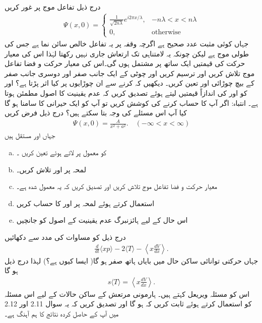 درج ذیل تفاعل موج پر غور کریں
\begin{align*}
\Psi(x,0) = \left\{ \begin{array}{lc}
\frac{1}{\sqrt{2n\lambda}}e^{i2\pi x/\lambda}, & -n\lambda < x < n \lambda \\ 0, & \text{otherwise}
\end{array} \right.
\end{align*}
جہاں  کوئی مثبت عدد صحیح ہے
اگرچہ وقفہ  پر یہ تفاعل خالص سائن نما ہے جس کی طولی موج  ہے لیکن چونکہ یہ لامتناہی تک ارتعاش جاری نہیں رکھتا لہٰذا اس کی معیار حرکت کی قیمتیں ایک ساتھ پر مشتمل ہوں گی۔اس کی معیار حرکت و فضا تفاعل موج  تلاش کریں  اور  ترسیم کریں اور چوٹی کے ایک جانب صفر اور دوسری جانب صفر کے بیچ چوڑائی اور  تعین کریں۔ دیکھیں کہ  کرنے سے ان چوڑایوں پر کیا اثر پڑتا ہے؟
  اور  کو اور  کی اندازاً قیمتیں لیتے ہوئے تصدیق کریں کہ عدم یقینیت کا اصول مطمئن ہوتا ہے۔ انتباہ: اگر آپ  کا حساب کرنے کی کوشش کریں تو آپ کو ایک حیرانی کا سامنا ہو گا کیا آپ اس مسئلے کی وجہ بتا سکتے ہیں؟ 
درج ذیل فرض کریں
\begin{align*}
\Psi(x,0) = \frac{A}{x^{2}+a^{2}}. \quad (-\infty < x < \infty)
\end{align*}
جہاں  اور  مستقل ہیں
\begin{enumerate}[a.]
\item {}کو معمول پر لاتے ہوئے  تعین کریں ۔
\item لمحہ  پر  اور  تلاش کریں۔
\item معیار حرکت و فضا تفاعل موج  تلاش کریں اور تصدیق کریں کہ یہ معمول شدہ ہے۔
\item {}استعمال کرتے ہوئے لمحہ  پر  اور  کا حساب کریں 
\item  اس حال کے لیے ہائزنبرگ عدم یقینیت کے اصول کو جانچیں 
\end{enumerate}
 درج ذیل کو مساوات  کی مدد سے دکھائیں 
\begin{align}
\frac{d}{dt} \langle xp \rangle -2\langle T \rangle - \left\langle x \frac{dV}{dx} \right\rangle. 
\end{align}
جہاں  حرکتی توانائی  ساکن حال میں بایاں ہاتھ صفر ہو گا( ایسا کیوں ہے؟) لہذا درج ذیل ہو گا 
\begin{align}
s\langle T \rangle = \left\langle x \frac{dV}{dx} \right\rangle. 
\end{align}
اس کو مسئلہ ویریعل کہتے ہیں۔ ہارمونی مرتعش کے ساکن حالات کے لیے اس مسئلہ کو استعمال کرتے ہوئے ثابت کریں کہ  ہو گا اور تصدیق کریں کہ یہ سوال 2.11 اور 2.12 میں آپ کے حاصل کردہ نتائج کا ہم آہنگ ہے۔
